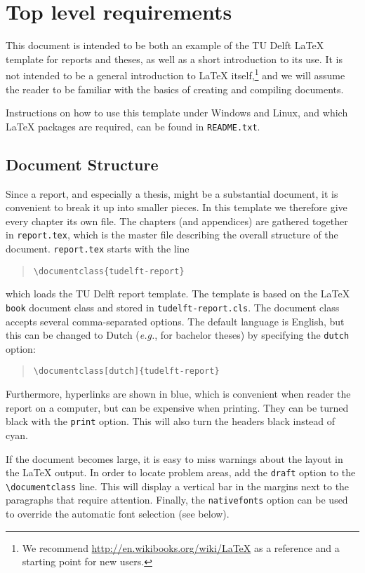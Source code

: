 \chapter{Top level requirements}

This document is intended to be both an example of the TU Delft \LaTeX{} template for reports and theses, as well as a short introduction to its use. It is not intended to be a general introduction to \LaTeX{} itself,\footnote{We recommend \url{http://en.wikibooks.org/wiki/LaTeX} as a reference and a starting point for new users.} and we will assume the reader to be familiar with the basics of creating and compiling documents.

Instructions on how to use this template under Windows and Linux, and which \LaTeX{} packages are required, can be found in \texttt{README.txt}.

\section{Document Structure}

Since a report, and especially a thesis, might be a substantial document, it is convenient to break it up into smaller pieces. In this template we therefore give every chapter its own file. The chapters (and appendices) are gathered together in \texttt{report.tex}, which is the master file describing the overall structure of the document. \texttt{report.tex} starts with the line
\begin{quote}
    \texttt{\textbackslash documentclass\{tudelft-report\}}
\end{quote}
which loads the TU Delft report template. The template is based on the \LaTeX{} \texttt{book} document class and stored in \texttt{tudelft-report.cls}. The document class accepts several comma-separated options. The default language is English, but this can be changed to Dutch (\emph{e.g.}, for bachelor theses) by specifying the \texttt{dutch} option:
\begin{quote}
    \texttt{\textbackslash documentclass[dutch]\{tudelft-report\}}
\end{quote}
Furthermore, hyperlinks are shown in blue, which is convenient when reader the report on a computer, but can be expensive when printing. They can be turned black with the \texttt{print} option. This will also turn the headers black instead of cyan.

If the document becomes large, it is easy to miss warnings about the layout in the \LaTeX{} output. In order to locate problem areas, add the \texttt{draft} option to the \texttt{\textbackslash documentclass} line. This will display a vertical bar in the margins next to the paragraphs that require attention. Finally, the \texttt{nativefonts} option can be used to override the automatic font selection (see below).

